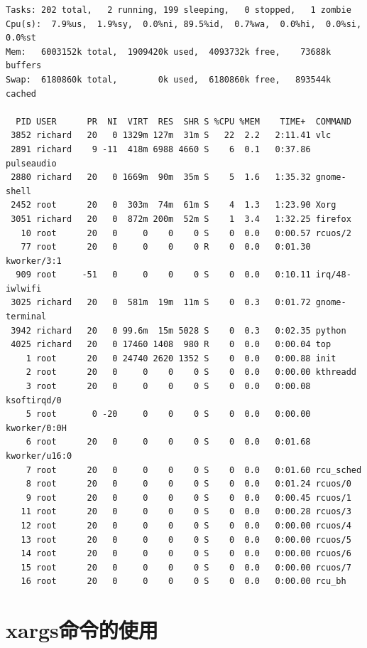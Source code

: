 \begin{verbatim}
Tasks: 202 total,   2 running, 199 sleeping,   0 stopped,   1 zombie
Cpu(s):  7.9%us,  1.9%sy,  0.0%ni, 89.5%id,  0.7%wa,  0.0%hi,  0.0%si,  0.0%st
Mem:   6003152k total,  1909420k used,  4093732k free,    73688k buffers
Swap:  6180860k total,        0k used,  6180860k free,   893544k cached

  PID USER      PR  NI  VIRT  RES  SHR S %CPU %MEM    TIME+  COMMAND                                                   
 3852 richard   20   0 1329m 127m  31m S   22  2.2   2:11.41 vlc                                                                 
 2891 richard    9 -11  418m 6988 4660 S    6  0.1   0:37.86 pulseaudio 
 2880 richard   20   0 1669m  90m  35m S    5  1.6   1:35.32 gnome-shell
 2452 root      20   0  303m  74m  61m S    4  1.3   1:23.90 Xorg
 3051 richard   20   0  872m 200m  52m S    1  3.4   1:32.25 firefox
   10 root      20   0     0    0    0 S    0  0.0   0:00.57 rcuos/2
   77 root      20   0     0    0    0 R    0  0.0   0:01.30 kworker/3:1
  909 root     -51   0     0    0    0 S    0  0.0   0:10.11 irq/48-iwlwifi
 3025 richard   20   0  581m  19m  11m S    0  0.3   0:01.72 gnome-terminal
 3942 richard   20   0 99.6m  15m 5028 S    0  0.3   0:02.35 python
 4025 richard   20   0 17460 1408  980 R    0  0.0   0:00.04 top
    1 root      20   0 24740 2620 1352 S    0  0.0   0:00.88 init
    2 root      20   0     0    0    0 S    0  0.0   0:00.00 kthreadd
    3 root      20   0     0    0    0 S    0  0.0   0:00.08 ksoftirqd/0
    5 root       0 -20     0    0    0 S    0  0.0   0:00.00 kworker/0:0H                                                                            
    6 root      20   0     0    0    0 S    0  0.0   0:01.68 kworker/u16:0
    7 root      20   0     0    0    0 S    0  0.0   0:01.60 rcu_sched
    8 root      20   0     0    0    0 S    0  0.0   0:01.24 rcuos/0
    9 root      20   0     0    0    0 S    0  0.0   0:00.45 rcuos/1
   11 root      20   0     0    0    0 S    0  0.0   0:00.28 rcuos/3
   12 root      20   0     0    0    0 S    0  0.0   0:00.00 rcuos/4
   13 root      20   0     0    0    0 S    0  0.0   0:00.00 rcuos/5
   14 root      20   0     0    0    0 S    0  0.0   0:00.00 rcuos/6
   15 root      20   0     0    0    0 S    0  0.0   0:00.00 rcuos/7
   16 root      20   0     0    0    0 S    0  0.0   0:00.00 rcu_bh
\end{verbatim}



\section{xargs命令的使用}
\label{sec:xargsCmd}

